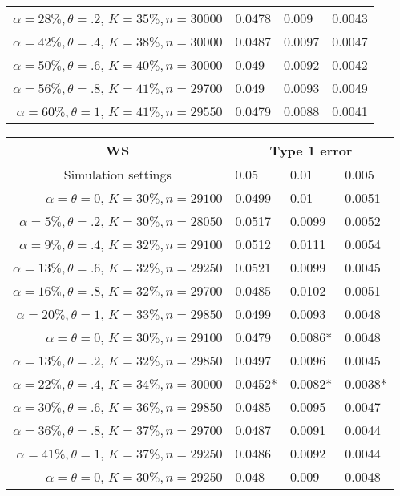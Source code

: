 \documentclass[11pt,a4paper]{article}
\begin{document}
\begin{table}[ht]
\begin{minipage}[b]{.7\linewidth}
\begin{tabular}{r|lll}
$\alpha = 28\%, \theta = .2$, $K=35\%, n=30000$ &   0.0478& 0.009 &0.0043 \\ 
$\alpha = 42\%, \theta = .4$, $K=38\%, n=30000$ &   0.0487& 0.0097 &0.0047 \\ 
$\alpha = 50\%, \theta = .6$, $K=40\%, n=30000$ &   0.049& 0.0092 &0.0042 \\ 
$\alpha = 56\%, \theta = .8$, $K=41\%, n=29700$ &   0.049& 0.0093 &0.0049 \\ 
$\alpha = 60\%, \theta = 1$, $K=41\%, n=29550$ &   0.0479& 0.0088 &0.0041 \\ 
\end{tabular}
\end{minipage}
\begin{minipage}[b]{.7\linewidth}
\begin{tabular}{r|lll}
\multicolumn{1}{c|}{\bf WS}&\multicolumn{3}{c}{Type 1 error}\\
  \hline
\multicolumn{1}{c|}{Simulation settings} & 0.05 & 0.01 & 0.005 \\ 
  \hline\hline %
$\alpha = \theta = 0$, $K=30\%, n=29100$ &   0.0499& 0.01 &0.0051 \\ 
$\alpha = 5\%, \theta = .2$, $K=30\%, n=28050$ &   0.0517& 0.0099 &0.0052 \\ 
$\alpha = 9\%, \theta = .4$, $K=32\%, n=29100$ &   0.0512& 0.0111 &0.0054 \\ 
$\alpha = 13\%, \theta = .6$, $K=32\%, n=29250$ &   0.0521& 0.0099 &0.0045 \\ 
$\alpha = 16\%, \theta = .8$, $K=32\%, n=29700$ &   0.0485& 0.0102 &0.0051 \\ 
$\alpha = 20\%, \theta = 1$, $K=33\%, n=29850$ &   0.0499& 0.0093 &0.0048 \\
 \hline %
$\alpha = \theta = 0$, $K=30\%, n=29100$ &   0.0479& 0.0086* &0.0048 \\ 
$\alpha = 13\%, \theta = .2$, $K=32\%, n=29850$ &   0.0497& 0.0096 &0.0045 \\ 
$\alpha = 22\%, \theta = .4$, $K=34\%, n=30000$ &   0.0452*& 0.0082* &0.0038* \\ 
$\alpha = 30\%, \theta = .6$, $K=36\%, n=29850$ &   0.0485& 0.0095 &0.0047 \\ 
$\alpha = 36\%, \theta = .8$, $K=37\%, n=29700$ &   0.0487& 0.0091 &0.0044 \\ 
$\alpha = 41\%, \theta = 1$, $K=37\%, n=29250$ &   0.0486 & 0.0092 &0.0044 \\ 
\hline %
$\alpha = \theta = 0$, $K=30\%, n=29250$ &   0.048& 0.009 &0.0048 \\ 

\end{tabular}
\end{minipage}
\end{table}
\end{document}
